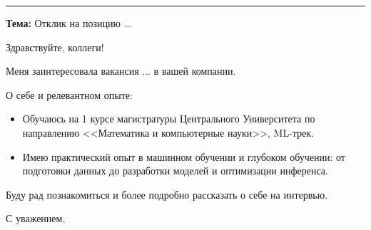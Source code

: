 \documentclass[letterpaper,11pt]{article}
\begin{document}

\vspace{0.5cm} %
\hrule %
\vspace{0.5cm}

\textbf{Тема:} Отклик на позицию ...

Здравствуйте, коллеги!

Меня заинтересовала вакансия ... в вашей компании.

О себе и релевантном опыте:
\begin{itemize}[leftmargin=0.2in, itemsep=2pt, topsep=0pt]
	\item Обучаюсь на 1 курсе магистратуры Центрального Университета по направлению <<Математика и компьютерные науки>>, ML-трек.
	\item Имею практический опыт в машинном обучении и глубоком обучении: от подготовки данных до разработки моделей и оптимизации инференса.
\end{itemize}

Буду рад познакомиться и более подробно рассказать о себе на интервью.

С уважением,\\
\fullName
\end{document}
